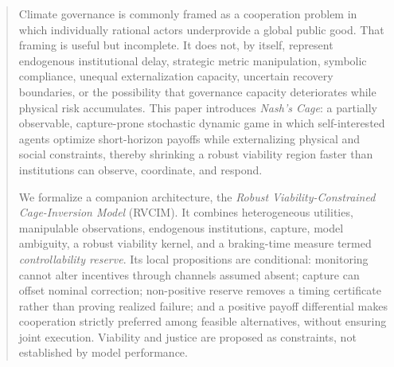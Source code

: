 \documentclass[11pt,a4paper]{article}
\numberwithin{equation}{section}
\theoremstyle{definition}
\theoremstyle{plain}
\theoremstyle{remark}
\newcommand{\RVCIM}{\textsc{RVCIM}}
\begin{document}
\begin{abstract}
Climate governance is commonly framed as a cooperation problem in which individually rational actors underprovide a global public good. That framing is useful but incomplete. It does not, by itself, represent endogenous institutional delay, strategic metric manipulation, symbolic compliance, unequal externalization capacity, uncertain recovery boundaries, or the possibility that governance capacity deteriorates while physical risk accumulates. This paper introduces \emph{Nash's Cage}: a partially observable, capture-prone stochastic dynamic game in which self-interested agents optimize short-horizon payoffs while externalizing physical and social constraints, thereby shrinking a robust viability region faster than institutions can observe, coordinate, and respond.

We formalize a companion architecture, the \emph{Robust Viability-Constrained Cage-Inversion Model} (\RVCIM). It combines heterogeneous utilities, manipulable observations, endogenous institutions, capture, model ambiguity, a robust viability kernel, and a braking-time measure termed \emph{controllability reserve}. Its local propositions are conditional: monitoring cannot alter incentives through channels assumed absent; capture can offset nominal correction; non-positive reserve removes a timing certificate rather than proving realized failure; and a positive payoff differential makes cooperation strictly preferred among feasible alternatives, without ensuring joint execution. Viability and justice are proposed as constraints, not established by model performance.


\end{abstract}
\end{document}

